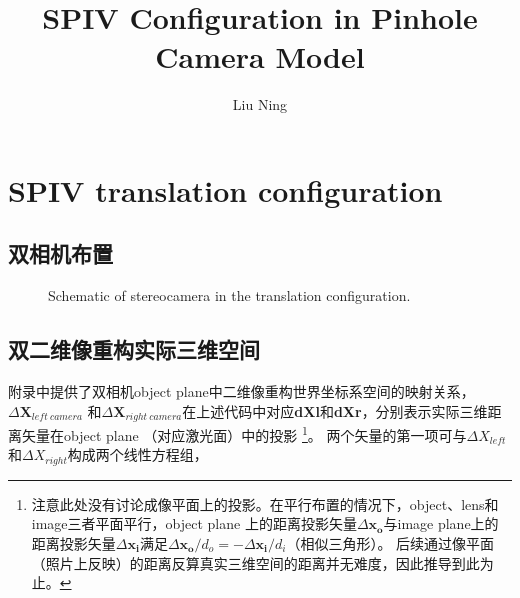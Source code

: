 \documentclass{article}
\begin{document}
\title{SPIV Configuration in Pinhole Camera Model}
\author{ Liu Ning }
\maketitle

\section{SPIV translation configuration}

\subsection{双相机布置}

\begin{figure}[htbp]
  \centering
  \caption{Schematic of stereocamera in the translation configuration.}
\end{figure}

\subsection{双二维像重构实际三维空间}

附录中提供了双相机object plane中二维像重构世界坐标系空间的映射关系，$\Delta \mathbf{X}_{left~  camera}$ 和$\Delta \mathbf{X}_{right~camera}$在上述代码中对应\textbf{dXl}和\textbf{dXr}，分别表示实际三维距离矢量在object plane （对应激光面）中的投影
\footnote{注意此处没有讨论成像平面上的投影。在平行布置的情况下，object、lens和image三者平面平行，object plane 上的距离投影矢量$\Delta \mathbf{x_o}$与image plane上的距离投影矢量$\Delta \mathbf{x_i}$满足$\Delta \mathbf{x_o} / d_o = - \Delta \mathbf{x_i} / d_i$（相似三角形）。 后续通过像平面（照片上反映）的距离反算真实三维空间的距离并无难度，因此推导到此为止。}。
两个矢量的第一项可与$\Delta X_{ {left}}$和$\Delta X_{ {right}}$构成两个线性方程组，
\end{document}
